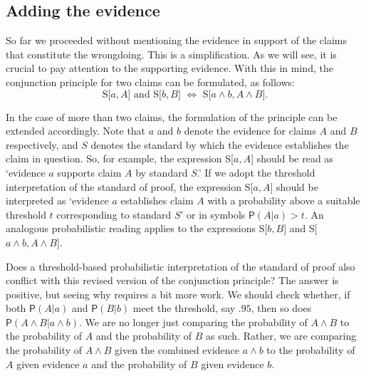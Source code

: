 \documentclass[
  10pt,
  dvipsnames,enabledeprecatedfontcommands]{scrartcl}
\newcommand{\pr}[1]{\ensuremath{\mathsf{P}(#1)}}
\begin{document}
\hypertarget{adding-the-evidence}{%
\subsection{Adding the evidence}\label{adding-the-evidence}}

So far we proceeded without mentioning the evidence in support of the
claims that constitute the wrongdoing. This is a simplification. As we
will see, it is crucial to pay attention to the supporting evidence.
With this in mind, the conjunction principle for two claims can be
formulated, as follows:
\[\text{S[$a, A$] and S[$b, B$] $\Leftrightarrow$ S[$a \wedge b, A\wedge B$]}.\]

\noindent In the case of more than two claims, the formulation of the
principle can be extended accordingly. Note that \(a\) and \(b\) denote
the evidence for claims \(A\) and \(B\) respectively, and \(S\) denotes
the standard by which the evidence establishes the claim in question.
So, for example, the expression S{[}\(a, A\){]} should be read as
`evidence \(a\) supports claim \(A\) by standard \(S\).' If we adopt the
threshold interpretation of the standard of proof, the expression
S{[}\(a, A\){]} should be interpreted as `evidence \(a\) establishes
claim \(A\) with a probability above a suitable threshold \(t\)
corresponding to standard \(S\)' or in symbols \(\pr{A \vert a}>t\). An
analogous probabilistic reading applies to the expressions
S{[}\(b, B\){]} and S{[}\(a \wedge b, A\wedge B\){]}.

Does a threshold-based probabilistic interpretation of the standard of
proof also conflict with this revised version of the conjunction
principle? The answer is positive, but seeing why requires a bit more
work. We should check whether, if both \(\pr{A \vert a}\) and
\(\pr{B \vert b}\) meet the threshold, say \(.95\), then so does
\(\pr{A\wedge B \vert a\wedge b}\). We are no longer just comparing the
probability of \(A\wedge B\) to the probability of \(A\) and the
probability of \(B\) as such. Rather, we are comparing the probability
of \(A \wedge B\) given the combined evidence \(a \wedge b\) to the
probability of \(A\) given evidence \(a\) and the probability of \(B\)
given evidence \(b\).
\end{document}
